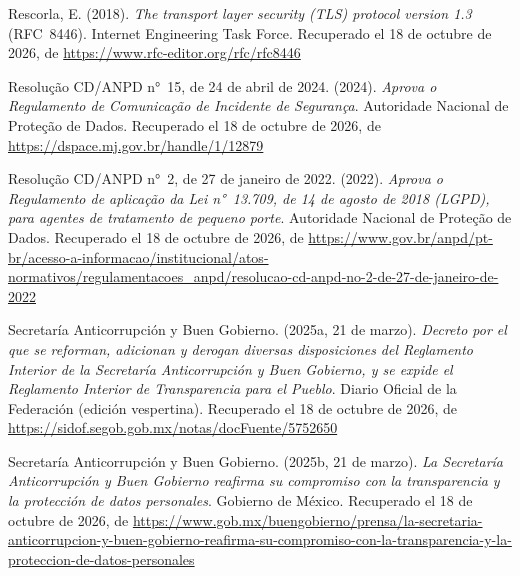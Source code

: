 \documentclass[12pt, a4paper]{article}
\begin{document}
\begin{list}{}{\setlength{\leftmargin}{1.27cm}\setlength{\itemindent}{-1.27cm}%
  \setlength{\labelwidth}{0pt}\setlength{\labelsep}{0pt}\setlength{\itemsep}{6pt}}
\item Rescorla, E. (2018). \textit{The transport layer security
  (TLS) protocol version 1.3} (RFC~8446). Internet Engineering
  Task Force.
  Recuperado el 18 de octubre de 2026, de \url{https://www.rfc-editor.org/rfc/rfc8446}


\item Resolução CD/ANPD n°~15, de 24 de abril de 2024. (2024).
  \textit{Aprova o Regulamento de Comunicação de Incidente de
  Segurança}. Autoridade Nacional de Proteção de Dados.
  Recuperado el 18 de octubre de 2026, de \url{https://dspace.mj.gov.br/handle/1/12879}
 
  
\item Resolução CD/ANPD n°~2, de 27 de janeiro de 2022. (2022).
  \textit{Aprova o Regulamento de aplicação da Lei n°~13.709, de
  14 de agosto de 2018 (LGPD), para agentes de tratamento de
  pequeno porte}. Autoridade Nacional de Proteção de Dados.
  Recuperado el 18 de octubre de 2026, de \url{https://www.gov.br/anpd/pt-br/acesso-a-informacao/institucional/atos-normativos/regulamentacoes_anpd/resolucao-cd-anpd-no-2-de-27-de-janeiro-de-2022}
 
\item Secretaría Anticorrupción y Buen Gobierno. (2025a, 21 de
  marzo). \textit{Decreto por el que se reforman, adicionan y derogan diversas disposiciones del
  Reglamento Interior de la Secretaría Anticorrupción y Buen
  Gobierno, y se expide el Reglamento Interior de Transparencia para el Pueblo}. Diario Oficial de la Federación (edición vespertina).
Recuperado el 18 de octubre de 2026, de \url{https://sidof.segob.gob.mx/notas/docFuente/5752650}

\item Secretaría Anticorrupción y Buen Gobierno. (2025b,
  21 de marzo). \textit{La Secretaría Anticorrupción y Buen
  Gobierno reafirma su compromiso con la transparencia y la
  protección de datos personales}. Gobierno de México.
  Recuperado el 18 de octubre de 2026, de \url{https://www.gob.mx/buengobierno/prensa/la-secretaria-anticorrupcion-y-buen-gobierno-reafirma-su-compromiso-con-la-transparencia-y-la-proteccion-de-datos-personales}


\end{list}
\end{document}

